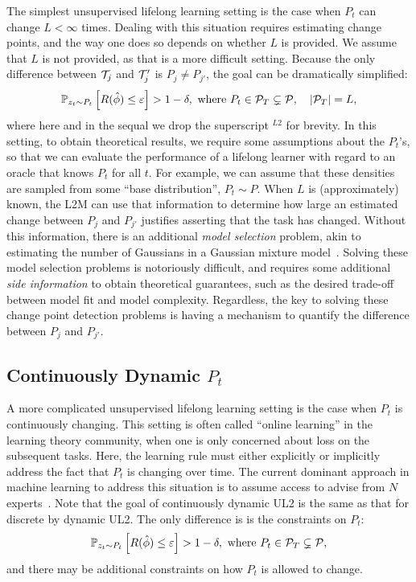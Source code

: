 \documentclass{article}
\begin{document}
The simplest unsupervised lifelong learning setting is the case when $P_t$ can change $L < \infty$ times.  Dealing with this situation requires estimating change points, and the way one does so depends on whether $L$ is provided.  We assume that $L$ is not provided, as that is a more difficult setting.  Because  the only difference between $\mathcal{T}_j$ and $\mathcal{T}_j'$ is $P_j \neq P_{j'}$, the goal can be dramatically simplified:
\begin{align} \label{eq:online}        
    \mathbb{P}_{ z_t \sim P_t} \left[R(\hat{\phi})  \leq \varepsilon \right] > 1 - \delta, \text{ where } P_t \in \mathcal{P}_T \subsetneq \mathcal{P}, \quad |\mathcal{P}_T| = L,
\end{align}
where here and in the sequal we drop the superscript $^{L2}$ for brevity. In this setting, to obtain theoretical results, we require some assumptions about the $P_t$'s, so that we can evaluate the performance of a lifelong learner with regard to an oracle that knows $P_t$ for all $t$.  For example, we can assume that these densities are sampled from some ``base distribution'', $P_t \sim P$. When $L$ is (approximately) known, the L2M can use that information to determine how large an estimated change between $P_j$ and $P_{j'}$ justifies asserting that the task has changed.  Without this information, there is an additional \emph{model selection} problem, akin to estimating the number of Gaussians in a Gaussian mixture model~\cite{GMM}.  Solving these model selection problems is notoriously difficult, and requires some additional \emph{side information} to obtain theoretical guarantees, such as the desired trade-off between model fit and model complexity.  Regardless, the key to solving these change point detection problems is having a mechanism to quantify the difference between $P_j$ and $P_{j'}$. 




\subsection{Continuously Dynamic $P_t$}
\label{sec:smooth}

A  more complicated unsupervised lifelong learning setting is the case when $P_t$ is continuously changing.  This setting is often called ``online learning'' in the learning theory community, when one is only concerned about loss on the subsequent tasks. Here, the learning rule must either explicitly or implicitly address the fact that $P_t$ is  changing over time.  The current dominant approach in machine learning to address this situation is to assume access to advise from $N$ experts~\cite{Mohri2012}. Note that the goal of continuously dynamic UL2 is the same as that for discrete by dynamic UL2.  The only difference is is the constraints on $P_t$:
\begin{align} \label{eq:online}        
    \mathbb{P}_{ z_t \sim P_t} \left[R(\hat{\phi})  \leq \varepsilon \right] > 1 - \delta, \text{ where } P_t \in \mathcal{P}_T \subsetneq \mathcal{P}, 
\end{align}
and there may be additional constraints on how $P_t$ is allowed to change.
\end{document}
